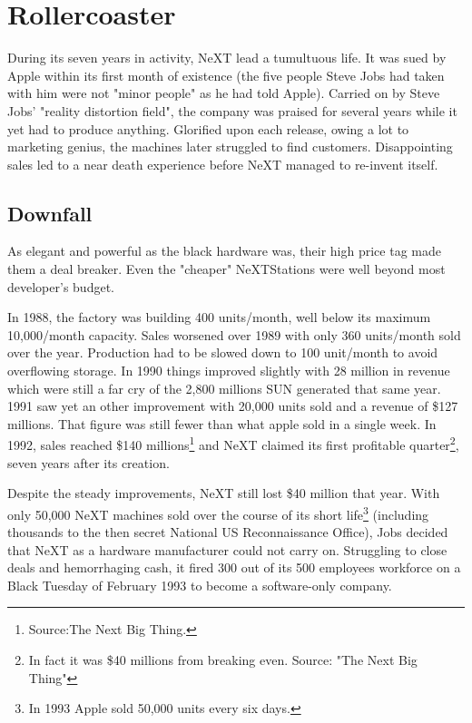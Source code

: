 \section{Rollercoaster}
During its seven years in activity, NeXT lead a tumultuous life. It was sued by Apple within its first month of existence (the five people Steve Jobs had taken with him were not "minor people" as he had told Apple). Carried on by Steve Jobs' "reality distortion field", the company was praised for several years while it yet had to produce anything. Glorified upon each release, owing a lot to marketing genius, the machines later struggled to find customers. Disappointing sales led to a near death experience before NeXT managed to re-invent itself.\\
\par

\subsection{Downfall}
As elegant and powerful as the black hardware was, their high price tag made them a deal breaker. Even the "cheaper" NeXTStations were well beyond most developer's budget.\\
\par
 In 1988, the factory was building 400 units/month, well below its maximum 10,000/month capacity. Sales worsened over 1989 with only 360 units/month sold over the year. Production had to be slowed down to 100 unit/month to avoid overflowing storage. In 1990 things improved slightly with 28 million in revenue which were still a far cry of the 2,800 millions SUN generated that same year. 1991 saw yet an other improvement with 20,000 units sold and a revenue of \$127 millions. That figure was still fewer than what apple sold in a single week. In 1992, sales reached \$140 millions\footnote{Source:The Next Big Thing.} and NeXT claimed its first profitable quarter\footnote{In fact it was \$40 millions from breaking even. Source: "The Next Big Thing"}, seven years after its creation.\\
\par
Despite the steady improvements, NeXT still lost \$40 million that year. With only 50,000 NeXT machines sold over the course of its short life\footnote{In 1993 Apple sold 50,000 units every six days.} (including thousands to the then secret National US Reconnaissance Office), Jobs decided that NeXT as a hardware manufacturer could not carry on. Struggling to close deals and hemorrhaging cash, it fired 300 out of its 500 employees workforce on a Black Tuesday of February 1993 to become a software-only company.\\
